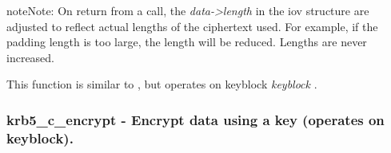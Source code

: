 \documentclass[letterpaper,10pt,english]{sphinxmanual}
\begin{document}


{\hyperref[appdev/refs/api/krb5_c_decrypt_iov:krb5_c_decrypt_iov]{}}



\begin{notice}{note}{Note:}
On return from a {\hyperref[appdev/refs/api/krb5_c_decrypt_iov:krb5_c_decrypt_iov]{}} call, the \emph{data-\textgreater{}length} in the iov structure are adjusted to reflect actual lengths of the ciphertext used. For example, if the padding length is too large, the length will be reduced. Lengths are never increased.

This function is similar to {\hyperref[appdev/refs/api/krb5_k_decrypt_iov:krb5_k_decrypt_iov]{}} , but operates on keyblock \emph{keyblock} .
\end{notice}


\subsubsection{krb5\_c\_encrypt -  Encrypt data using a key (operates on keyblock).}
\label{appdev/refs/api/krb5_c_encrypt::doc}\label{appdev/refs/api/krb5_c_encrypt:krb5-c-encrypt-encrypt-data-using-a-key-operates-on-keyblock}

\begin{fulllineitems}
\label{appdev/refs/api/krb5_c_encrypt:krb5_c_encrypt}
\end{fulllineitems}
\end{document}
